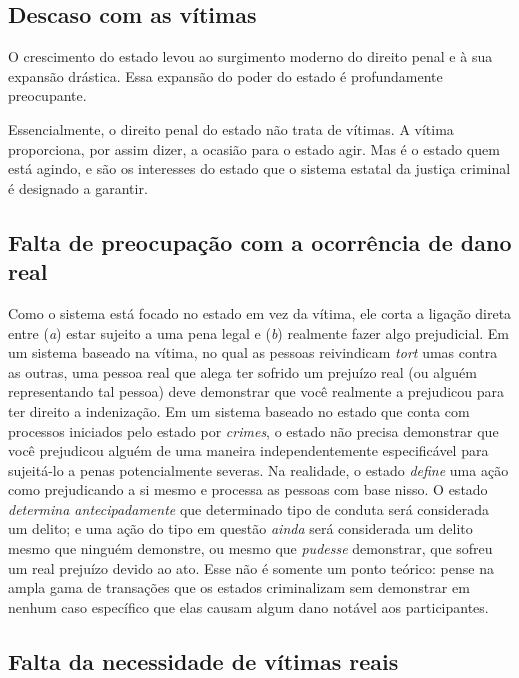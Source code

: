 \subsection*{Descaso com as vítimas}

O crescimento do estado levou ao surgimento moderno do direito penal e à sua expansão drástica. Essa expansão do poder do estado é profundamente preocupante.

Essencialmente, o direito penal do estado não trata de vítimas. A vítima proporciona, por assim dizer, a ocasião para o estado agir. Mas é o estado quem está agindo, e são os interesses do estado que o sistema estatal da justiça criminal é designado a garantir.

\subsection*{Falta de preocupação com a ocorrência de dano real}

Como o sistema está focado no estado em vez da vítima, ele corta a ligação direta entre (\emph{a}) estar sujeito a uma pena legal e (\emph{b}) realmente fazer algo prejudicial. Em um sistema baseado na vítima, no qual as pessoas reivindicam \emph{tort} umas contra as outras, uma pessoa real que alega ter sofrido um prejuízo real (ou alguém representando tal pessoa) deve demonstrar que você realmente a prejudicou para ter direito a indenização. Em um sistema baseado no estado que conta com processos iniciados pelo estado por \emph{crimes}, o estado não precisa demonstrar que você prejudicou alguém de uma maneira independentemente especificável para sujeitá-lo a penas potencialmente severas. Na realidade, o estado \emph{define} uma ação como prejudicando a si mesmo e processa as pessoas com base nisso. O estado \emph{determina antecipadamente} que determinado tipo de conduta será considerada um delito; e uma ação do tipo em questão \emph{ainda} será considerada um delito mesmo que ninguém demonstre, ou mesmo que \emph{pudesse} demonstrar, que sofreu um real prejuízo devido ao ato. Esse não é somente um ponto teórico: pense na ampla gama de transações que os estados criminalizam sem demonstrar em nenhum caso específico que elas causam algum dano notável aos participantes.

\subsection*{Falta da necessidade de vítimas reais}

